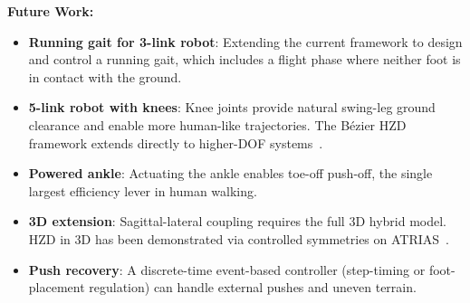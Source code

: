 \documentclass[conference]{IEEEtran}
\begin{document}
\textbf{Future Work:}
\begin{itemize}
    \item \textbf{Running gait for 3-link robot}: Extending the current framework to design and control a running gait, which includes a flight phase where neither foot is in contact with the ground.
    \item \textbf{5-link robot with knees}: Knee joints provide natural swing-leg ground clearance and enable more human-like trajectories. The B\'ezier HZD framework extends directly to higher-DOF systems~\cite{plestan2003}.
    \item \textbf{Powered ankle}: Actuating the ankle enables toe-off push-off, the single largest efficiency lever in human walking.
    \item \textbf{3D extension}: Sagittal-lateral coupling requires the full 3D hybrid model. HZD in 3D has been demonstrated via controlled symmetries on ATRIAS~\cite{ramezani2013}.
    \item \textbf{Push recovery}: A discrete-time event-based controller (step-timing or foot-placement regulation) can handle external pushes and uneven terrain.
\end{itemize}
\end{document}
